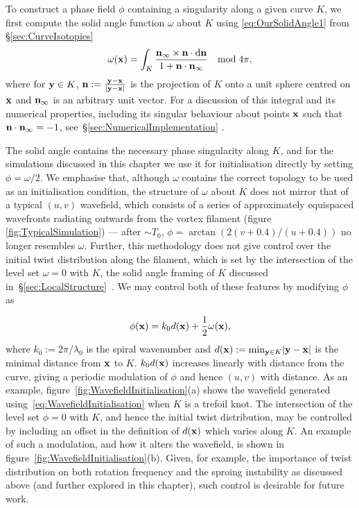 To construct a phase field $\phi$ containing a singularity along a given curve $K$, we first compute the solid angle function $\omega$ about $K$ using \eqref{eq:OurSolidAngle1} from \S\ref{sec:CurveIsotopies}~\citep{Binysh2018} 
\begin{equation}
    \omega({\bf x}) = \int_{K} \frac{{\bf n}_\infty \times {\bf n} \cdot \mathrm{d}{\bf n}}{1 + {\bf n} \cdot {\bf n}_\infty} \quad \mathrm{mod}\;4\pi,
    \label{eq:SolidAngle}
\end{equation}
where for ${\bf y} \in K$, ${\bf n} := \frac{{\bf y} - {\bf x}}{|{\bf y}-\bf{x}|}$ is the projection of $K$ onto a unit sphere centred on $\bf x$ and ${\bf n}_\infty$ is an arbitrary unit vector. For a discussion of this integral and its numerical properties, including its singular behaviour about points ${\bf x}$ such that ${\bf n} \cdot {\bf n}_\infty = -1$, see~\S\ref{sec:NumericalImplementation} \citep{Binysh2018}. 
    

The solid angle contains the necessary phase singularity along $K$, and for the simulations discussed in this chapter we use it for initialisation directly by setting $\phi = \omega/2$. We emphasise that, although $\omega$ contains the correct topology to be used as an initialisation condition, the structure of $\omega$ about $K$ does not mirror that of a typical $(u,v)$ wavefield, which consists of a series of approximately equispaced wavefronts radiating outwards from the vortex filament (figure \ref{fig:TypicalSimulation}) --- after $\sim T_0$, $\phi = \arctan \left(2(v+0.4)/(u+0.4)\right)$ no longer resembles $\omega$. Further, this methodology does not give control over the initial twist distribution along the filament, which is set by the intersection of the level set $\omega=0$ with $K$, the solid angle framing of $K$ discussed in~\S\ref{sec:LocalStructure}~\citep{Binysh2018}. We may control both of these features by modifying $\phi$ as
    
\begin{equation}
\phi({\bf x}) = k_0 d({\bf x}) + \frac{1}{2} \omega({\bf x}), 
\label{eq:WavefieldInitialisation}
\end{equation}
where $k_0 := 2\pi / \lambda_0$ is the spiral wavenumber and $d({\bf x}):= \mathrm{min}_{{\bf y} \in K} |{\bf y}- {\bf x}|$ is the minimal distance from ${\bf x}$ to $K$. $k_0 d({\bf x})$ increases linearly with distance from the curve, giving a periodic modulation of $\phi$ and hence $(u,v)$ with distance. As an example, figure~\ref{fig:WavefieldInitialisation}(a) shows the wavefield generated using~\eqref{eq:WavefieldInitialisation} when $K$ is a trefoil knot. The intersection of the level set $\phi=0$ with $K$, and hence the initial twist distribution, may be controlled by including an offset in the definition of $d({\bf x})$ which varies along $K$. An example of such a modulation, and how it alters the wavefield, is shown in figure~\ref{fig:WavefieldInitialisation}(b). Given, for example, the importance of twist distribution on both rotation frequency and the sproing instability as discussed above (and further explored in this chapter), such control is desirable for future work.

